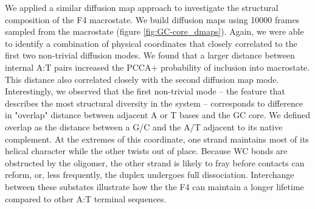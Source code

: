\documentclass[journal=jpcbfk,manuscript=article]{achemso}
\begin{document}
We applied a similar diffusion map approach to investigate the structural composition of the F4 macrostate. We build diffusion maps using 10000 frames sampled from the macrostate (figure \ref{fig:GC-core_dmaps}). Again, we were able to identify a combination of physical coordinates that closely correlated to the first two non-trivial diffusion modes. We found that a larger distance between internal A:T pairs increased the PCCA+ probability of inclusion into macrostate. This distance also correlated closely with the second diffusion map mode. Interestingly, we observed that the first non-trivial mode -- the feature that describes the most structural diversity in the system -- corresponds to difference in "overlap" distance between adjacent A or T bases and the GC core. We defined overlap as the distance between a G/C and the A/T adjacent to its native complement. At the extremes of this coordinate, one strand maintains most of its helical character while the other twists out of place. Because WC bonds are obstructed by the oligomer, the other strand is likely to fray before contacts can reform, or, less frequently, the duplex undergoes full dissociation. Interchange between these substates illustrate how the the F4 can maintain a longer lifetime compared to other A:T terminal sequences. 
\end{document}
